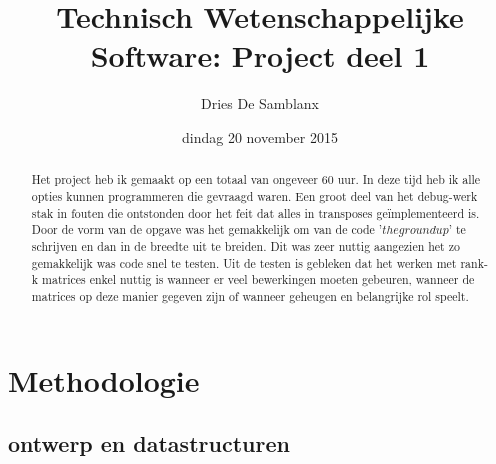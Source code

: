 \documentclass[a4paper]{article}
\title{Technisch Wetenschappelijke Software: Project deel 1}
\author{Dries De Samblanx}
\date{dindag 20 november 2015}
\begin{document}
\maketitle

\begin{abstract}

Het project heb ik gemaakt op een totaal van ongeveer 60 uur. In deze tijd heb ik alle opties kunnen programmeren die gevraagd waren. Een groot deel van het debug-werk stak in fouten die ontstonden door het feit dat alles in transposes ge\"implementeerd is. Door de vorm van de opgave was het gemakkelijk om van de code '\(the ground up\)' te schrijven en dan in de breedte uit te breiden. Dit was zeer nuttig aangezien het zo gemakkelijk was code snel te testen. Uit de testen is gebleken dat het werken met rank-k matrices enkel nuttig is wanneer er veel bewerkingen moeten gebeuren, wanneer de matrices op deze manier gegeven zijn of wanneer geheugen en belangrijke rol speelt. 

\end{abstract}

\section*{Methodologie}

\subsection*{ontwerp en datastructuren}
\end{document}
